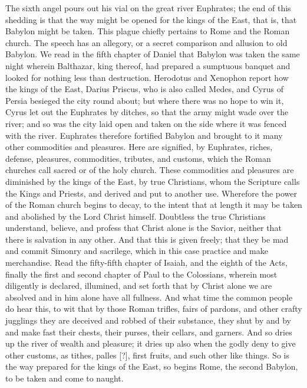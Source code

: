 The sixth angel pours out his vial on the great river Euphrates; the end of this shedding is that the way might be opened for the kings of the East, that is, that Babylon might be taken. This plague chiefly pertains to Rome and the Roman church. The speech has an allegory, or a secret comparison and allusion to old Babylon. We read in the fifth chapter of Daniel that Babylon was taken the same night wherein Balthazar, king thereof, had prepared a sumptuous banquet and looked for nothing less than destruction. Herodotus and Xenophon report how the kings of the East, Darius Priscus, who is also called Medes, and Cyrus of Persia besieged the city round about; but where there was no hope to win it, Cyrus let out the Euphrates by ditches, so that the army might wade over the river; and so was the city laid open and taken on the side where it was fenced with the river. Euphrates therefore fortified Babylon and brought to it many other commodities and pleasures. Here are signified, by Euphrates, riches, defense, pleasures, commodities, tributes, and customs, which the Roman churches call sacred or of the holy church. These commodities and pleasures are diminished by the kings of the East, by true Christians, whom the Scripture calls the Kings and Priests, and derived and put to another use. Wherefore the power of the Roman church begins to decay, to the intent that at length it may be taken and abolished by the Lord Christ himself. Doubtless the true Christians understand, believe, and profess that Christ alone is the Savior, neither that there is salvation in any other. And that this is given freely; that they be mad and commit Simonry and sacrilege, which in this case practice and make merchandise. Read the fifty-fifth chapter of Isaiah, and the eighth of the Acts, finally the first and second chapter of Paul to the Colossians, wherein most diligently is declared, illumined, and set forth that by Christ alone we are absolved and in him alone have all fullness. And what time the common people do hear this, to wit that by those Roman trifles, fairs of pardons, and other crafty jugglings they are deceived and robbed of their substance, they shut by and by and make fast their chests, their purses, their cellars, and garners. And so dries up the river of wealth and pleasure; it dries up also when the godly deny to give other customs, as tithes, palles [?], first fruits, and such other like things. So is the way prepared for the kings of the East, so begins Rome, the second Babylon, to be taken and come to naught.

